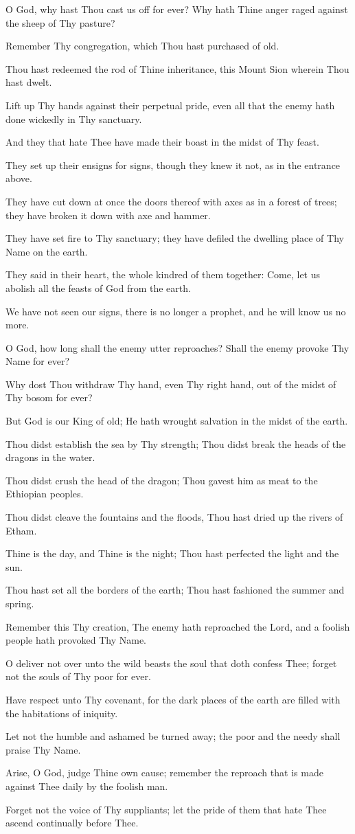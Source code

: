 O God, why hast Thou cast us off for ever? Why hath Thine anger raged against the sheep of Thy pasture?

Remember Thy congregation, which Thou hast purchased of old.

Thou hast redeemed the rod of Thine inheritance, this Mount Sion wherein Thou hast dwelt.

Lift up Thy hands against their perpetual pride, even all that the enemy hath done wickedly in Thy sanctuary.

And they that hate Thee have made their boast in the midst of Thy feast.

They set up their ensigns for signs, though they knew it not, as in the entrance above.

They have cut down at once the doors thereof with axes as in a forest of trees; they have broken it down with axe and hammer.

They have set fire to Thy sanctuary; they have defiled the dwelling place of Thy Name on the earth.

They said in their heart, the whole kindred of them together: Come, let us abolish all the feasts of God from the earth.

We have not seen our signs, there is no longer a prophet, and he will know us no more.

O God, how long shall the enemy utter reproaches? Shall the enemy provoke Thy Name for ever?

Why dost Thou withdraw Thy hand, even Thy right hand, out of the midst of Thy bosom for ever?

But God is our King of old; He hath wrought salvation in the midst of the earth.

Thou didst establish the sea by Thy strength; Thou didst break the heads of the dragons in the water.

Thou didst crush the head of the dragon; Thou gavest him as meat to the Ethiopian peoples.

Thou didst cleave the fountains and the floods, Thou hast dried up the rivers of Etham.

Thine is the day, and Thine is the night; Thou hast perfected the light and the sun.

Thou hast set all the borders of the earth; Thou hast fashioned the summer and spring.

Remember this Thy creation, The enemy hath reproached the Lord, and a foolish people hath provoked Thy Name.

O deliver not over unto the wild beasts the soul that doth confess Thee; forget not the souls of Thy poor for ever.

Have respect unto Thy covenant, for the dark places of the earth are filled with the habitations of iniquity.

Let not the humble and ashamed be turned away; the poor and the needy shall praise Thy Name.

Arise, O God, judge Thine own cause; remember the reproach that is made against Thee daily by the foolish man.

Forget not the voice of Thy suppliants; let the pride of them that hate Thee ascend continually before Thee.
